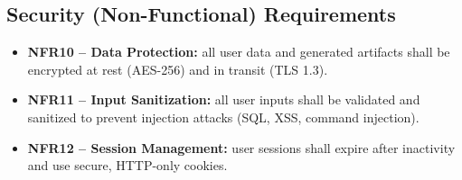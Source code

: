 \documentclass[12pt,a4paper,oneside]{report}
\begin{document}
\subsection{Security (Non-Functional) Requirements}
\begin{itemize}[leftmargin=*]
  \item \textbf{NFR10 -- Data Protection:} all user data and generated artifacts shall be encrypted at rest (AES-256) and in transit (TLS 1.3).
  \item \textbf{NFR11 -- Input Sanitization:} all user inputs shall be validated and sanitized to prevent injection attacks (SQL, XSS, command injection).
  \item \textbf{NFR12 -- Session Management:} user sessions shall expire after inactivity and use secure, HTTP-only cookies.
\end{itemize}
\end{document}
